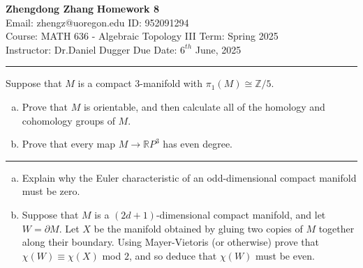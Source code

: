 \documentclass[letterpaper, 12pt]{article}
\begin{document}
\noindent
\large\textbf{Zhengdong Zhang} \hfill \textbf{Homework 8}  \\
Email: zhengz@uoregon.edu \hfill ID: 952091294  \\
\normalsize Course: MATH 636 - Algebraic Topology III \hfill Term: Spring 2025 \\
Instructor: Dr.Daniel Dugger \hfill Due Date: $6^{th}$ June, 2025  \\
\noindent\rule{7in}{2.8pt}
\begin{problem}{1}
Suppose that \(M\) is a compact 3-manifold with \(\pi_1(M)\cong \mathbb{Z}/5\). 
\begin{enumerate}[(a)]
\item Prove that \(M\) is orientable, and then calculate all of the homology and cohomology groups of \(M\). 
\item Prove that every map \(M\rightarrow \mathbb{R}P^3\) has even degree.
\end{enumerate}
\end{problem}
\begin{solution}

\end{solution}

\noindent\rule{7in}{2.8pt}
\begin{problem}{2}
\begin{enumerate}[(a)]
\item Explain why the Euler characteristic of an odd-dimensional compact manifold must be zero. 
\item Suppose that \(M\) is a \((2d+1)\)-dimensional compact manifold, and let \(W=\partial M\). Let \(X\) be the manifold obtained by gluing two copies of \(M\) together along their boundary. Using Mayer-Vietoris (or otherwise) prove that \(\chi(W)\equiv \chi(X)\) mod \(2\), and so deduce that \(\chi(W)\) must be even.
\end{enumerate}
\end{problem}
\begin{solution}

\end{solution}
\end{document}
